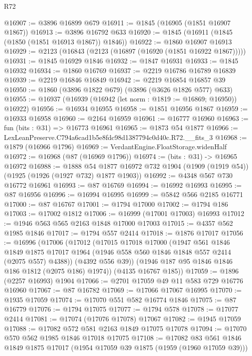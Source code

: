 \begin{lexlean}{R72}
\begin{coremodule}
@16907 := @3896 @16899 @679
@16911 := @1845 (@16905 (@1851 @16907 @1867))
@16913 := @3896 @16792 @633
@16920 := @1845 (@16911 (@1845 (@1850 (@1851 @16913 @1867)) @1846))
@16922 := @1860 @16907 @16913
@16929 := @2123 (@16843 (@2123 (@16897 (@16920 (@1851 @16922 @1867)))))
@16931 := @1845 @16929 @1846
@16932 := @1847 @16931
@16933 := @1845 @16932
@16934 := @1860 @16769
@16937 := @2219 @16786 @16789 @16839
@16939 := @2219 @16846 @16849
@16942 := @2219 @16854 @16857 @39
@16950 := @1860 (@3896 @1822 @679) (@3896 (@3626 @1826 @577) @633)
@16955 := @16937 (@16939 (@16942 (let norm : @1819 := @16869; @16950)) @16922)
@16956 := @16934 @16955
@16958 := @1851 @16956 @1867
@16959 := @16933 @16958
@16960 := @2164 @16959
@16961 := @16777 @16960
@16963 := fun (bits : @31) => @16773 @16961
@16965 := @1873 @54 @1877
@16966 := LexLeanPreserve.C794a6cad1b5e8fdc98d1387794c0d40c.R72.__fits_3
@16968 := @1879 (@16966 @1796)
@16969 := VerdantEngine.FloatStorage.widenHalf
@16972 := @16968 (@87 (@16969 @1796))
@16974 := (bits : @31) -> @16965 @16972
@16988 := @1888
    @54
    @1877
    @16972
    @732
    @1904
    (@1909 (@1919 @54))
    (@1925 (@1926 (@1927 @732) @1877 @1903))
@16992 := @4348 @567 @730 @16772 @16961
@16993 := @87 @16769
@16994 := @16992 @16993
@16995 := @87 @16956
@16996 := @16994 @16995
@16999 := @5842 @566 @2185 @16771
@17000 := @87 @16767
@17001 := @1794 @17000
@17002 := @1794 @186
@17003 := @17002 @1812
@17006 := @16999 (@17001 @17003) @16993
@17012 := @1946 @563 @565 @2163 @1848 @17000 @17003
@17015 := @4357 @562 @1985 @1846
@17017 := @1794 @557 @2414
@17018 := @1876 @17017
@17056 := @16996
    (@17006
      (@17012
        (@17015
          @17018
          @17000
          (@1947
            @561
            @1846
            @1849
            @1875
            @17017
            @1964
            (@1946 @558 @560 @1846 @1848 @557 @2414 (@2075 @557) @4388))
          (@4392 @556 @39))
        (@1946 @187 @95 @1846 @1846 @186 @1812 (@2075 @186) @1974))
      (@4135 @16767 @185))
@17059 := @1896 (@2257 @16993) @1904
@17066 := @2701 @17059 @49 @11 @583 @729 @16776 @16960
@17067 := @87 @16782
@17069 := @17066 @17067 @16995
@17070 := @1935 @17059
@17074 := @17070 @551 @582 @16774 @1846
@17075 := @87 @16779
@17076 := @1794 @17075
@17077 := @1794 @578
@17078 := @17077 @2414
@17081 := @17074 (@17076 @17078) @17067
@17082 := @1945 @17059
@17088 := @17082 @572 @581 @2163 @1849 @17075 @17078
@17094 := @17070 @570 @562 @1985 @1846 @17018 @17075
@17108 := @17082
    @83
    @561
    @1846
    @1849
    @1875
    @17017
    (@1954 @17059 @39 @1875 (@1959 (@1960 @17059 @39)))

\end{coremodule}
\end{lexlean}
